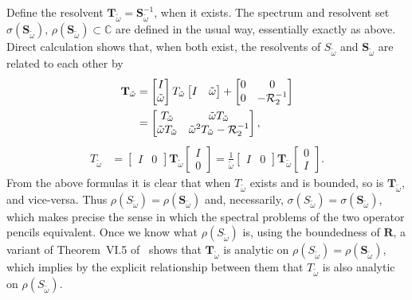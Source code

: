 \documentclass[aps, prd, amsmath, floats, floatfix, twocolumn, nofootinbib, superscriptaddress, showpacs]{revtex4-1}
\def\bC{{\mathbb C}}
\def\R{\mathbf{R}}
\def\bS{\mathbf{S}}
\def\T{\mathbf{T}}
\def\cR{\mathcal{R}}
\def\tomega{{\tilde{\omega}}}
\begin{document}
Define the resolvent $\T_\tomega = \bS_\tomega^{-1}$, when it
exists. The spectrum and resolvent set $\sigma(\bS_\tomega), \, \rho(\bS_\tomega) \subset
\bC$ are defined in the usual way, essentially exactly as above. Direct
calculation shows that, when both exist, the resolvents of $S_\tomega$
and $\bS_\tomega$ are related to each other by
\begin{align}
\notag
\T_\tomega
&= \begin{bmatrix} I \\ \tomega \end{bmatrix}
T_\tomega
\begin{bmatrix} I & \tomega \end{bmatrix}
+ \begin{bmatrix} 0 & 0 \\ 0 & -\cR_2^{-1} \end{bmatrix} \\
&= \begin{bmatrix}
T_\tomega & \tomega T_\tomega \\
\tomega T_\tomega & \tomega^2 T_\tomega - \cR_2^{-1}
\end{bmatrix}
,
\label{eq:quadR2linR}
\end{align}
%
\begin{align}
T_\tomega
&= \begin{bmatrix} I & 0 \end{bmatrix}
\T_\tomega
\begin{bmatrix} I \\ 0 \end{bmatrix}
= \frac{1}{\tomega} \begin{bmatrix} I & 0 \end{bmatrix}
\T_\tomega
\begin{bmatrix} 0 \\ I \end{bmatrix}
.
\end{align}
From the above formulas it is clear that when $T_\tomega$ exists and is
bounded, so is $\T_\tomega$, and vice-versa. Thus $\rho(S_\tomega) =
\rho(\bS_\tomega)$ and, necessarily, $\sigma(S_\tomega) = \sigma(\bS_\tomega)$, which makes
precise the sense in which the spectral problems of the two operator
pencils equivalent. Once we know what $\rho(S_\tomega)$ is, using the
boundedness of $\R$, a variant of Theorem~VI.5 of~\cite{reedsimon} shows that
$\T_\tomega$ is analytic on $\rho(S_\tomega)=\rho(\bS_\tomega)$, which implies by the
explicit relationship between them that $T_\tomega$ is also analytic on
$\rho(S_\tomega)$.
\end{document}
